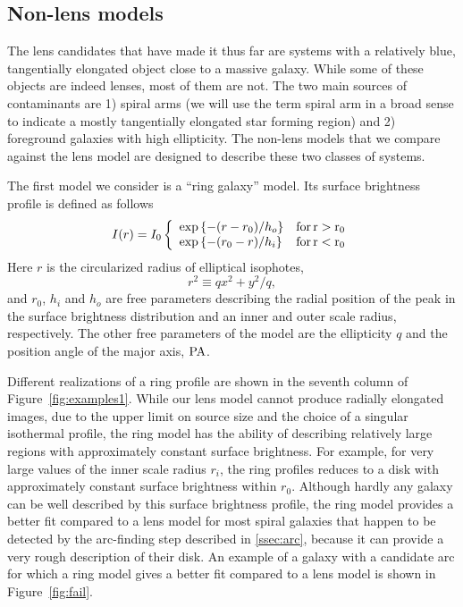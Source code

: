 \documentclass[a4paper,fleqn,usenatbib]{mnras}
\def\Fref#1{Figure~\ref{#1}\xspace}
\begin{document}
\subsection{Non-lens models}\label{ssec:nonlens}

The lens candidates that have made it thus far are systems with a relatively blue, tangentially elongated object close to a massive galaxy.
While some of these objects are indeed lenses, most of them are not.
The two main sources of contaminants are 1) spiral arms (we will use the term spiral arm in a broad sense to indicate a mostly tangentially elongated star forming region) and 2) foreground galaxies with high ellipticity.
The non-lens models that we compare against the lens model are designed to describe these two classes of systems.

The first model we consider is a ``ring galaxy'' model.
Its surface brightness profile is defined as follows
\begin{equation}\label{eq:ring}
I(r) = I_0 \left\{\begin{array}{ll} \exp{\{-(r-r_0)/h_o\}} & \rm{for}\,r>r_0 \\
\exp{\{-(r_0 - r)/h_i\}} & \rm{for}\,r<r_0\end{array}\right.
\end{equation}
Here $r$ is the circularized radius of elliptical isophotes,
\begin{equation}
r^2 \equiv qx^2 + y^2/q,
\end{equation}
and $r_0$, $h_i$ and $h_o$ are free parameters describing the radial position of the peak in the surface brightness distribution and an inner and outer scale radius, respectively.
The other free parameters of the model are the ellipticity $q$ and the position angle of the major axis, $\rm{PA}$.

Different realizations of a ring profile are shown in the seventh column of \Fref{fig:examples1}.
While our lens model cannot produce radially elongated images, due to the upper limit on source size and the choice of a singular isothermal profile, the ring model has the ability of describing relatively large regions with approximately constant surface brightness. For example, for very large values of the inner scale radius $r_i$, the ring profiles reduces to a disk with approximately constant surface brightness within $r_0$. 
Although hardly any galaxy can be well described by this surface brightness profile, the ring model provides a better fit compared to a lens model for most spiral galaxies that happen to be detected by the arc-finding step described in \ref{ssec:arc}, because it can provide a very rough description of their disk.
An example of a galaxy with a candidate arc for which a ring model gives a better fit compared to a lens model is shown in \Fref{fig:fail}.
\end{document}
